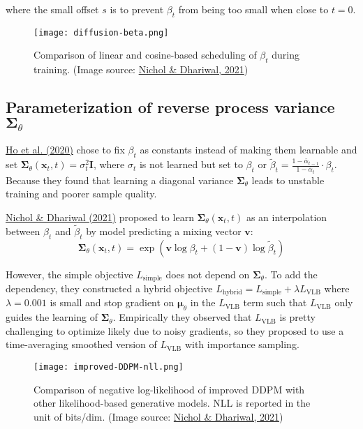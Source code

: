 \documentclass[12pt]{article}
\begin{document}
where the small offset $s$ is to prevent $\beta_t$ from being too small when close to $t=0$.

\begin{figure}[H]
    \centering
    \texttt{[image: diffusion-beta.png]}
    \caption{Comparison of linear and cosine-based scheduling of $\beta_t$ during training. (Image source: \href{https://arxiv.org/abs/2102.09672}{Nichol \& Dhariwal, 2021})}
\end{figure}

\subsection{Parameterization of reverse process variance $\boldsymbol{\Sigma}_\theta$}
\href{https://arxiv.org/abs/2006.11239}{Ho et al. (2020)} chose to fix $\beta_t$ as constants instead of making them learnable and set $\boldsymbol{\Sigma}_\theta(\mathbf{x}_t, t) = \sigma^2_t \mathbf{I}$, where $\sigma_t$ is not learned but set to $\beta_t$ or $\tilde{\beta}_t = \frac{1 - \bar{\alpha}_{t-1}}{1 - \bar{\alpha}_t} \cdot \beta_t$. Because they found that learning a diagonal variance $\boldsymbol{\Sigma}_\theta$ leads to unstable training and poorer sample quality.

\href{https://arxiv.org/abs/2102.09672}{Nichol \& Dhariwal (2021)} proposed to learn $\boldsymbol{\Sigma}_\theta(\mathbf{x}_t, t)$ as an interpolation between $\beta_t$ and $\tilde{\beta}_t$ by model predicting a mixing vector $\mathbf{v}$:
\[
\boldsymbol{\Sigma}_\theta(\mathbf{x}_t, t) = \exp(\mathbf{v} \log \beta_t + (1-\mathbf{v}) \log \tilde{\beta}_t)
\]

However, the simple objective $L_\text{simple}$ does not depend on $\boldsymbol{\Sigma}_\theta$. To add the dependency, they constructed a hybrid objective $L_\text{hybrid} = L_\text{simple} + \lambda L_\text{VLB}$ where $\lambda=0.001$ is small and stop gradient on $\boldsymbol{\mu}_\theta$ in the $L_\text{VLB}$ term such that $L_\text{VLB}$ only guides the learning of $\boldsymbol{\Sigma}_\theta$. Empirically they observed that $L_\text{VLB}$ is pretty challenging to optimize likely due to noisy gradients, so they proposed to use a time-averaging smoothed version of $L_\text{VLB}$ with importance sampling.

\begin{figure}[H]
    \centering
    \texttt{[image: improved-DDPM-nll.png]}
    \caption{Comparison of negative log-likelihood of improved DDPM with other likelihood-based generative models. NLL is reported in the unit of bits/dim. (Image source: \href{https://arxiv.org/abs/2102.09672}{Nichol \& Dhariwal, 2021})}
\end{figure}
\end{document}
